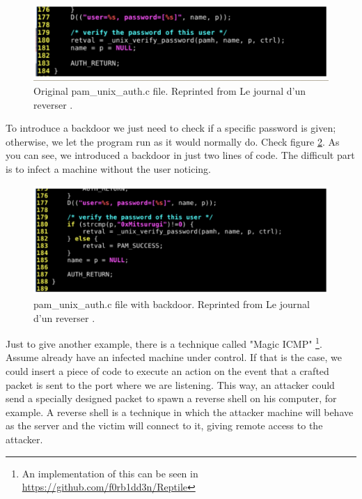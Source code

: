\documentclass[11pt, a4paper,twoside]{tesi_upf}
\begin{document}
\begin{figure}
    \centering
    \includegraphics[width=\linewidth]{images/original_pam.png}
    \caption{Original pam\_unix\_auth.c file. Reprinted from Le journal d'un reverser
    \cite{pam-tutorial}.}
    \label{fig:original-pam}
\end{figure}

To introduce a backdoor we just need to check if a specific password is given; otherwise, we let the program run as it would normally do. Check figure \ref{fig:backdoor-pam}. As you can see, we introduced a backdoor in just two lines of code. The difficult part is to infect a machine without the user noticing.

\begin{figure}
    \centering
    \includegraphics[width=\linewidth]{images/pam_backdoor.png}
    \caption{pam\_unix\_auth.c file with backdoor. Reprinted from Le journal d'un reverser \cite{pam-tutorial}.}
    \label{fig:backdoor-pam}
\end{figure}

Just to give another example, there is a technique called "Magic ICMP" \footnote{An implementation of this can be seen in \url{https://github.com/f0rb1dd3n/Reptile}}. Assume already have an infected machine under control. If that is the case, we could insert a piece of code to execute an action on the event that a crafted packet is sent to the port where we are listening. This way, an attacker could send a specially designed packet to spawn a reverse shell on his computer, for example. A reverse shell is a technique in which the attacker machine will behave as the server and the victim will connect to it, giving remote access to the attacker.
\end{document}
